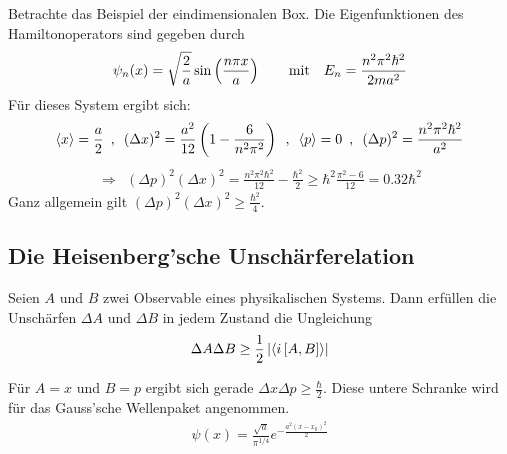 Betrachte das Beispiel der eindimensionalen Box. Die Eigenfunktionen des Hamiltonoperators
sind gegeben durch
\begin{align*}
    \psi_n (x) = \sqrt{\frac{2}{a}} \sin \left( \frac{n \pi x}{a} \right)
    \hspace{20pt} \text{mit} \hspace{10pt}
    E_n = \frac{n^2 \pi^2 \hbar^2}{2 m a^2}
\end{align*}
Für dieses System ergibt sich:
\begin{align*}
    \langle x \rangle = \frac{a}{2}
    \hspace{5pt} , \hspace{5pt}
    (\Delta x)^2 = \frac{a^2}{12} \left( 1 - \frac{6}{n^2 \pi^2} \right)
    \hspace{5pt} , \hspace{5pt}
    \langle p \rangle = 0
    \hspace{5pt} , \hspace{5pt}
    (\Delta p)^2 = \frac{n^2 \pi^2 \hbar^2}{a^2}
\end{align*}
\begin{align*}
    \Rightarrow \ \ (\Delta p)^2 (\Delta x)^2 = \frac{n^2 \pi^2 \hbar^2}{12} - \frac{\hbar^2}{2}
    \geq \hbar^2 \frac{\pi^2 - 6}{12} = 0.32 \hbar^2
\end{align*}
Ganz allgemein gilt $(\Delta p)^2 (\Delta x)^2 \geq \frac{\hbar^2}{4}$.

\subsection{Die Heisenberg'sche Unschärferelation}

\begin{theorem}
    Seien $A$ und $B$ zwei Observable eines physikalischen Systems. Dann erfüllen
    die Unschärfen $\Delta A$ und $\Delta B$ in jedem Zustand die Ungleichung
    \begin{align*}
        \Delta A \Delta B \geq \frac{1}{2} \left\vert \langle i \left[ A,B \right] \rangle \right\vert
    \end{align*}
\end{theorem}

Für $A = x$ und $B = p$ ergibt sich gerade $\Delta x \Delta p \geq \frac{\hbar}{2}$.
Diese untere Schranke wird für das Gauss'sche Wellenpaket angenommen.
\begin{align*}
    \psi(x) = \frac{\sqrt{a}}{\pi^{1/4}} e^{- \frac{a^2 (x - x_0)^2}{2}}
\end{align*}

